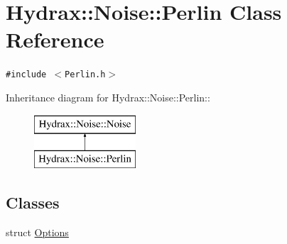 \hypertarget{class_hydrax_1_1_noise_1_1_perlin}{
\section{Hydrax::Noise::Perlin Class Reference}
\label{class_hydrax_1_1_noise_1_1_perlin}
}
{\tt \#include $<$Perlin.h$>$}

Inheritance diagram for Hydrax::Noise::Perlin::\begin{figure}[H]
\begin{center}
\leavevmode
\includegraphics[height=2cm]{class_hydrax_1_1_noise_1_1_perlin}
\end{center}
\end{figure}
\subsection*{Classes}
\begin{CompactItemize}
\item 
struct \hyperlink{struct_hydrax_1_1_noise_1_1_perlin_1_1_options}{Options}
\end{CompactItemize}
